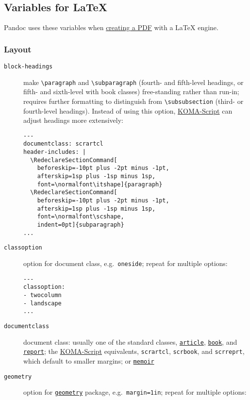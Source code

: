 \hypertarget{variables-for-latex}{%
\subsection{Variables for LaTeX}\label{variables-for-latex}}

Pandoc uses these variables when
\protect\hyperlink{creating-a-pdf}{creating a PDF} with a LaTeX engine.

\hypertarget{layout}{%
\subsubsection{Layout}\label{layout}}

\begin{description}
\item[\texttt{block-headings}]
make \texttt{\textbackslash{}paragraph} and
\texttt{\textbackslash{}subparagraph} (fourth- and fifth-level headings,
or fifth- and sixth-level with book classes) free-standing rather than
run-in; requires further formatting to distinguish from
\texttt{\textbackslash{}subsubsection} (third- or fourth-level
headings). Instead of using this option,
\href{https://ctan.org/pkg/koma-script}{KOMA-Script} can adjust headings
more extensively:

\begin{verbatim}
---
documentclass: scrartcl
header-includes: |
  \RedeclareSectionCommand[
    beforeskip=-10pt plus -2pt minus -1pt,
    afterskip=1sp plus -1sp minus 1sp,
    font=\normalfont\itshape]{paragraph}
  \RedeclareSectionCommand[
    beforeskip=-10pt plus -2pt minus -1pt,
    afterskip=1sp plus -1sp minus 1sp,
    font=\normalfont\scshape,
    indent=0pt]{subparagraph}
...
\end{verbatim}
\item[\texttt{classoption}]
option for document class, e.g.~\texttt{oneside}; repeat for multiple
options:

\begin{verbatim}
---
classoption:
- twocolumn
- landscape
...
\end{verbatim}
\item[\texttt{documentclass}]
document class: usually one of the standard classes,
\href{https://ctan.org/pkg/article}{\texttt{article}},
\href{https://ctan.org/pkg/book}{\texttt{book}}, and
\href{https://ctan.org/pkg/report}{\texttt{report}}; the
\href{https://ctan.org/pkg/koma-script}{KOMA-Script} equivalents,
\texttt{scrartcl}, \texttt{scrbook}, and \texttt{scrreprt}, which
default to smaller margins; or
\href{https://ctan.org/pkg/memoir}{\texttt{memoir}}
\item[\texttt{geometry}]
option for \href{https://ctan.org/pkg/geometry}{\texttt{geometry}}
package, e.g.~\texttt{margin=1in}; repeat for multiple options:


\end{description}
